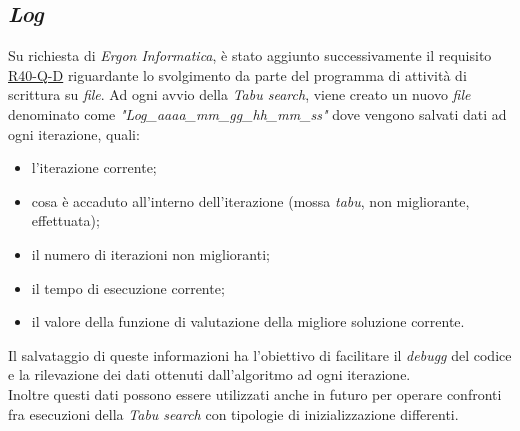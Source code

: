 \subsection{\textit{Log}}
\label{sec:log}
\noindent Su richiesta di \textit{Ergon Informatica}, è stato aggiunto successivamente il requisito \hyperref[tab:requisiti-qualitativi]{R40-Q-D}
riguardante lo svolgimento da parte del programma di attività di scrittura
su \textit{file}. Ad ogni avvio della \textit{Tabu search}, viene creato un nuovo
\textit{file} denominato come \textit{"Log\_aaaa\_mm\_gg\_hh\_mm\_ss"}
dove vengono salvati dati ad ogni iterazione, quali:
\begin{itemize}
    \item l'iterazione corrente;
    \item cosa è accaduto all'interno dell'iterazione (mossa \textit{tabu}, non migliorante, effettuata);
    \item il numero di iterazioni non miglioranti;
    \item il tempo di esecuzione corrente;
    \item il valore della funzione di valutazione della migliore soluzione corrente.
\end{itemize}
Il salvataggio di queste informazioni ha
l’obiettivo di facilitare il \textit{\gls{debugg}}
del codice e la rilevazione dei dati ottenuti
dall’algoritmo ad ogni iterazione.\\
Inoltre questi dati possono essere utilizzati anche in futuro
per operare confronti fra esecuzioni della \textit{Tabu search} con
tipologie di inizializzazione differenti.

\newpage

